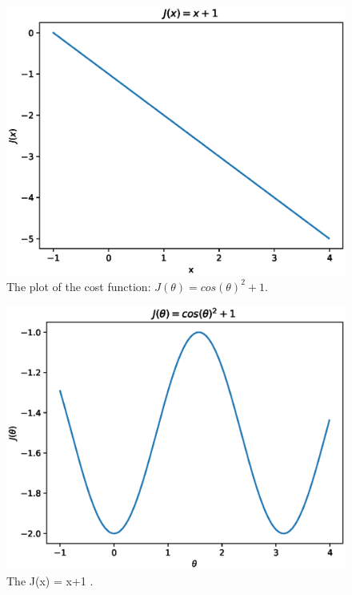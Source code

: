 \documentclass[a4paper,12pt]{article}
\begin{document}
\begin{figure}[H]
\begin{center}
\includegraphics[width=1.0\linewidth]{line.eps}

\end{center}
   \caption{The plot of the cost function: $J(\theta) = cos(\theta)^2+1$.  }
\label{fig:line_cost_sphe}
\end{figure}



\begin{figure}[H]
\begin{center}
\includegraphics[width=1.0\linewidth]{line_sphe.eps}


\end{center}
   \caption{The J(x) = x+1 .  }
\label{fig:e1}
\end{figure}
\end{document}
